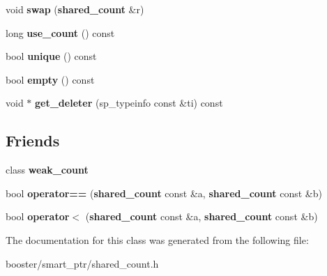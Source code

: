 \begin{DoxyCompactItemize}
\item 
void {\bfseries swap} ({\bf shared\-\_\-count} \&r)\label{classbooster_1_1detail_1_1shared__count_af3626fdb2cfe76d0d6118064db95c2dd}

\item 
long {\bfseries use\-\_\-count} () const \label{classbooster_1_1detail_1_1shared__count_a43820697b7614ecaa0fea25a2ededd79}

\item 
bool {\bfseries unique} () const \label{classbooster_1_1detail_1_1shared__count_adf17c934b1bc1260c0ea7d04056cd7c4}

\item 
bool {\bfseries empty} () const \label{classbooster_1_1detail_1_1shared__count_a17fc5656ef9befe883837f8566124246}

\item 
void $\ast$ {\bfseries get\-\_\-deleter} (sp\-\_\-typeinfo const \&ti) const \label{classbooster_1_1detail_1_1shared__count_a92f2ed9d04dba29eb71e71ed5960cd8e}

\end{DoxyCompactItemize}
\subsection*{Friends}
\begin{DoxyCompactItemize}
\item 
class {\bfseries weak\-\_\-count}\label{classbooster_1_1detail_1_1shared__count_a52546549a7fd30c6519bbed0aa62423a}

\item 
bool {\bfseries operator==} ({\bf shared\-\_\-count} const \&a, {\bf shared\-\_\-count} const \&b)\label{classbooster_1_1detail_1_1shared__count_aef780234c6f1b295c4cd4bc78268081a}

\item 
bool {\bfseries operator$<$} ({\bf shared\-\_\-count} const \&a, {\bf shared\-\_\-count} const \&b)\label{classbooster_1_1detail_1_1shared__count_afb9b6fff363ab72cfaa7f3af7518c21b}

\end{DoxyCompactItemize}


The documentation for this class was generated from the following file\-:\begin{DoxyCompactItemize}
\item 
booster/smart\-\_\-ptr/shared\-\_\-count.\-h\end{DoxyCompactItemize}
